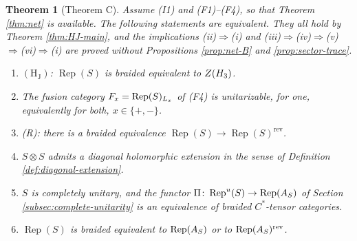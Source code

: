 \documentclass[leqno]{article}
\let\cal\relax
\newcommand{\cal}{\mathcal}
\newcommand{\co}{\colon}
\newcommand{\ot}{\otimes}
\DeclareMathOperator{\Rep}{Rep}
\newtheorem{thm}{Theorem}[section]
\numberwithin{equation}{section}
\begin{document}
\begin{thm}[Theorem C]
\label{thm:unitarity-equivalences}
Assume \textup{(I1)} and \textup{(F1)}--\textup{(F4)}, so that Theorem \ref{thm:net} is available. The following statements are equivalent. They all hold by Theorem \ref{thm:HJ-main}, and the implications \textup{(ii)}$\Rightarrow$\textup{(i)} and \textup{(iii)}$\Rightarrow$\textup{(iv)}$\Rightarrow$\textup{(v)}$\Rightarrow$\textup{(vi)}$\Rightarrow$\textup{(i)} are proved without Propositions \ref{prop:net-B} and \ref{prop:sector-trace}.
\begin{enumerate}
\item[\textup{(i)}] $\mathrm{(H_J)}$: $\Rep(S)$ is braided equivalent to $Z(\cal H_3)$.
\item[\textup{(ii)}] The fusion category $\cal F_x = \Rep(S)_{L_x}$ of \textup{(F4)} is unitarizable, for one, equivalently for both, $x \in \{+,-\}$.
\item[\textup{(iii)}] \textup{(R)}: there is a braided equivalence $\Rep(S) \to \Rep(S)^{\mathrm{rev}}$.
\item[\textup{(iv)}] $S \ot S$ admits a diagonal holomorphic extension in the sense of Definition \ref{def:diagonal-extension}.
\item[\textup{(v)}] $S$ is completely unitary, and the functor $\Pi \co \Rep^u(S) \to \Rep(\cal A_S)$ of Section \ref{subsec:complete-unitarity} is an equivalence of braided $C^*$-tensor categories.
\item[\textup{(vi)}] $\Rep(S)$ is braided equivalent to $\Rep(\cal A_S)$ or to $\Rep(\cal A_S)^{\mathrm{rev}}$.
\end{enumerate}
\end{thm}
\end{document}
